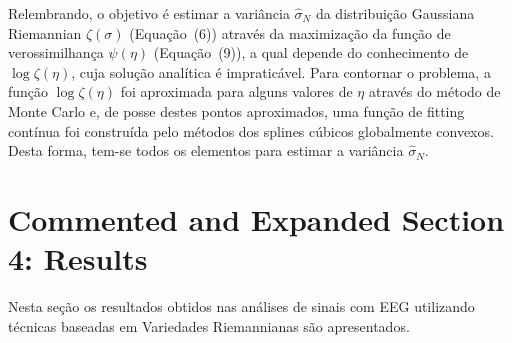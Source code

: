 \documentclass[a4paper,titlepage]{article}
\begin{document}
\begin{center}
  \vspace{1em}
  \vspace{1em}
\end{center}

Relembrando, o objetivo é estimar a variância $\hat{\sigma}_N$ da distribuição
Gaussiana Riemannian $\zeta(\sigma)$ (Equação~(6)) através da maximização da
função de verossimilhança $\psi(\eta)$ (Equação~(9)), a qual depende do
conhecimento de $\log \zeta(\eta)$, cuja solução analítica é impraticável.
Para contornar o problema, a função $\log \zeta(\eta)$ foi aproximada para
alguns valores de $\eta$ através do método de Monte Carlo e, de posse destes
pontos aproximados, uma função de fitting contínua foi construída pelo métodos
dos splines cúbicos globalmente convexos. Desta forma, tem-se todos os
elementos para estimar a variância $\hat{\sigma}_N$.

\section{Commented and Expanded Section 4: Results}
Nesta seção os resultados obtidos nas análises de sinais com EEG utilizando
técnicas baseadas em Variedades Riemannianas são apresentados.

\begin{center}
  \vspace{1em}
  \vspace{1em}
\end{center}
\end{document}
